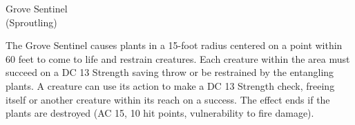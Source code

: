 \documentclass[letterpaper,openany,twoside,twocolumn]{book}
\begin{document}
\begin{DndMonster}[width=0.5\textwidth]{Grove Sentinel\\(Sproutling)}
	\DndMonsterAttack[
      name=Slam,
      distance=melee, %
      mod=+4,
      reach=5,
      targets=one target,
      dmg=\DndDice{1d6 + 2},
      dmg-type=bludgeoning,
    ]
    
	The Grove Sentinel causes plants in a 15-foot radius centered on a point within 60 feet to come to life and restrain creatures. Each creature within the area must succeed on a DC 13 Strength saving throw or be restrained by the entangling plants. A creature can use its action to make a DC 13 Strength check, freeing itself or another creature within its reach on a success. The effect ends if the plants are destroyed (AC 15, 10 hit points, vulnerability to fire damage).
      
\end{DndMonster}

\vspace*{-20cm}\hspace*{6cm}%

\newpage
\end{document}
